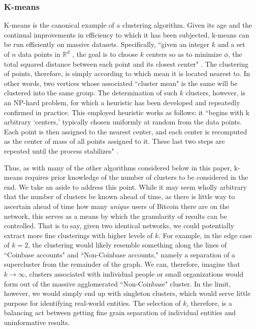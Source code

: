 \documentclass{article}
\begin{document}
\subsubsection{K-means}
K-means is the canonical example of a clustering algorithm. Given its age and the continual improvements in efficiency to which it has been subjected, k-means can be run efficiently on massive datasets. Specifically, ``given an integer $k$ and a set of $n$ data points in $\mathbb{R}^d$ , the goal is to choose $k$ centers so as to minimize $\phi$, the total squared distance between each point and its closest center" \cite{k-means}. The clustering of points, therefore, is simply according to which mean it is located nearest to. In other words, two vertices whose associated ``cluster mean" is the same will be clustered into the same group. The determination of such $k$ clusters, however, is an NP-hard problem, for which a heuristic has been developed and repeatedly confirmed in practice. This employed heuristic works as follows: it ``begins with k arbitrary `centers,' typically chosen uniformly at random from the data points. Each point is then assigned to the nearest center, and each center is recomputed as the center of mass of all points assigned to it. These last two steps are repeated until the process stabilizes" \cite{k-means}. 

Thus, as with many of the other algorithms considered below in this paper, k-means requires prior knowledge of the number of clusters to be considered in the end. We take an aside to address this point. While it may seem wholly arbitrary that the number of clusters be known ahead of time, as there is little way to ascertain ahead of time how many \textit{unique} users of Bitcoin there are on the network, this serves as a means by which the granularity of results can be controlled. That is to say, given two identical networks, we could potentially extract more fine clusterings with higher levels of $k$. For example, in the edge case of $k=2$, the clustering would likely resemble something along the lines of ``Coinbase accounts" and ``Non-Coinbase accounts," namely a separation of a supercluster from the remainder of the graph. We can, therefore, imagine that $k\rightarrow\infty$, clusters associated with individual people or small organizations would form out of the massive agglomerated ``Non-Coinbase" cluster. In the limit, however, we would simply end up with singleton clusters, which would serve little purpose for identifying real-world entities. The selection of $k$, therefore, is a balancing act between getting fine grain separation of individual entities and uninformative results.
\end{document}
